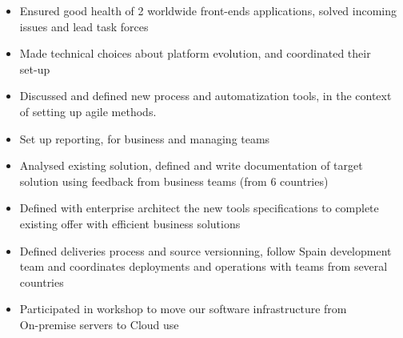 \documentclass[10pt,a4paper,ragged2e]{src/altacv}
\begin{document}
\divider

\small
{}
\normalsize
\hspace{3em}
\begin{itemize}
\item Ensured good health of 2 worldwide front-ends applications, solved incoming issues and lead task forces
\item Made technical choices about platform evolution, and coordinated their\\ set-up
\item Discussed and defined new process and automatization tools, in the context of setting up agile methods.
\item Set up reporting, for business and managing teams
\end{itemize}

\divider

\small
{}
\normalsize
\hspace{3em}
\begin{itemize}
\item Analysed existing solution, defined and write documentation of target solution using feedback from business teams (from 6 countries)
\item Defined with enterprise architect the new tools specifications to complete existing offer with efficient business solutions
\item Defined deliveries process and source versionning, follow Spain development team and coordinates deployments and operations with teams from several countries
\item Participated in workshop to move our software infrastructure from\\ On-premise servers to Cloud use
\end{itemize}
\end{document}
